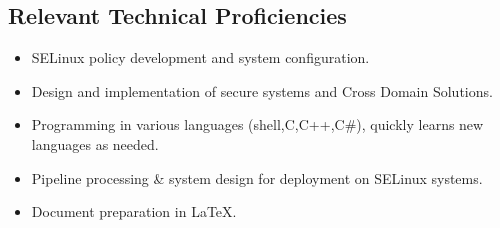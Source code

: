 \begin {resume}
    \section {Relevant Technical Proficiencies}
    \begin {itemize}
      \setlength {\itemsep}{1pt}
      \setlength {\parskip}{0pt}
      \setlength {\parsep}{0pt}
      \item SELinux policy development and system configuration.
      \item Design and implementation of secure systems and Cross Domain Solutions.
      \item Programming in various languages (shell,C,C++,C\#), quickly learns new languages as needed.
      \item Pipeline processing \& system design for deployment on SELinux systems.
      \item Document preparation in \LaTeX.
    \end {itemize}
  \end {resume}

